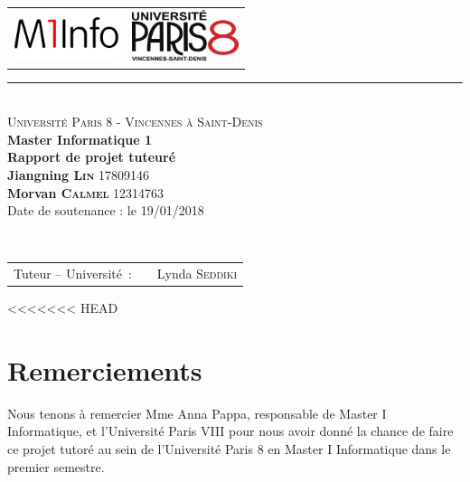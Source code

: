 \documentclass[a4paper, 12pt]{book}
\begin{document}
\begin{titlepage}
  \begin{center}
    \begin{tabular*}{\textwidth}{l@{\extracolsep{\fill}}r}
      \includegraphics[height=1.5cm]{images/m1info.png}&
      \includegraphics[height=1.5cm]{images/logo_paris8.png}
    \end{tabular*}
    \small 
    \rule{\textwidth}{.5pt}~\\
    \large 
    \textsc{Université Paris 8 - Vincennes à Saint-Denis}\vspace{0.5cm}\\
    \textbf{Master Informatique 1}\vspace{3.0cm}\\
    \Huge
    \textbf{Rapport de projet tuteuré}\vspace{1.5cm}\\
    \large
    \textbf{Jiangning \textsc{Lin}} 17809146\\
    \textbf{Morvan \textsc{Calmel}} 12314763\vspace{1.5cm}\\
    Date de soutenance : le 19/01/2018\vspace{1.75cm}\\
  \end{center}\vspace{1.5cm}~\\
	\begin{tabular}{ll}
	\hspace{-0.45cm}Tuteur -- Université~:~&~Lynda \textsc{Seddiki}\\
  \end{tabular}
\end{titlepage}
\frontmatter
\tableofcontents
\mainmatter

<<<<<<< HEAD
\chapter{Remerciements}
Nous tenons à remercier Mme Anna Pappa, responsable de Master I Informatique, et l’Université Paris VIII pour nous avoir donné la chance de faire ce projet tutoré au sein de l’Université Paris 8 en Master I Informatique dans le premier semestre.\\
\end{document}
